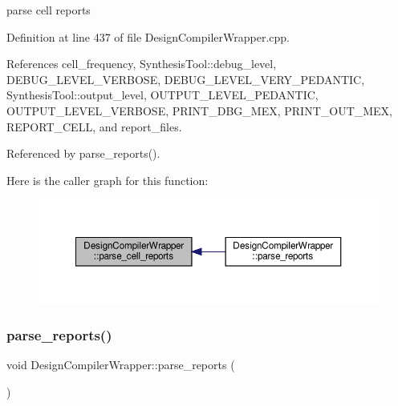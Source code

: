 parse cell reports 



Definition at line 437 of file Design\+Compiler\+Wrapper.\+cpp.



References cell\+\_\+frequency, Synthesis\+Tool\+::debug\+\_\+level, D\+E\+B\+U\+G\+\_\+\+L\+E\+V\+E\+L\+\_\+\+V\+E\+R\+B\+O\+SE, D\+E\+B\+U\+G\+\_\+\+L\+E\+V\+E\+L\+\_\+\+V\+E\+R\+Y\+\_\+\+P\+E\+D\+A\+N\+T\+IC, Synthesis\+Tool\+::output\+\_\+level, O\+U\+T\+P\+U\+T\+\_\+\+L\+E\+V\+E\+L\+\_\+\+P\+E\+D\+A\+N\+T\+IC, O\+U\+T\+P\+U\+T\+\_\+\+L\+E\+V\+E\+L\+\_\+\+V\+E\+R\+B\+O\+SE, P\+R\+I\+N\+T\+\_\+\+D\+B\+G\+\_\+\+M\+EX, P\+R\+I\+N\+T\+\_\+\+O\+U\+T\+\_\+\+M\+EX, R\+E\+P\+O\+R\+T\+\_\+\+C\+E\+LL, and report\+\_\+files.



Referenced by parse\+\_\+reports().

Here is the caller graph for this function\+:
\nopagebreak
\begin{figure}[H]
\begin{center}
\leavevmode
\includegraphics[width=350pt]{d5/d55/classDesignCompilerWrapper_a02ce587a350321c1d587beb1fd3810af_icgraph}
\end{center}
\end{figure}
\mbox{\label{classDesignCompilerWrapper_a7a64611e48e20a4cf7f3dc3e6f4fcfcd}} 
\subsubsection{\texorpdfstring{parse\+\_\+reports()}{parse\_reports()}}
{\footnotesize\ttfamily void Design\+Compiler\+Wrapper\+::parse\+\_\+reports (\begin{DoxyParamCaption}{ }\end{DoxyParamCaption})\hspace{0.3cm}{\ttfamily [protected]}}



